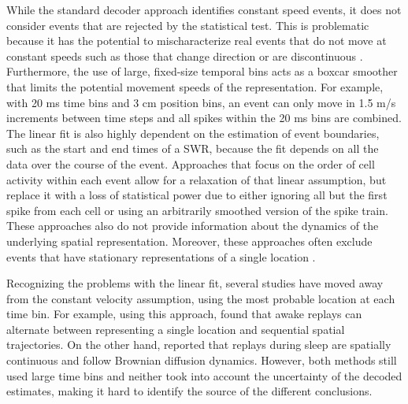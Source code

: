 \documentclass[9pt,lineno]{elife}
\begin{document}
While the standard decoder approach identifies constant speed events, it does not consider events that are rejected by the statistical test. This is problematic because it has the potential to mischaracterize real events that do not move at constant speeds such as those that change direction or are discontinuous \citep{LiuMethodsAssessmentMemory2018}. Furthermore, the use of large, fixed-size temporal bins acts as a boxcar smoother that limits the potential movement speeds of the representation. For example, with 20 ms time bins and 3 cm position bins, an event can only move in 1.5 m/s increments between time steps and all spikes within the 20 ms bins are combined. The linear fit is also highly dependent on the estimation of event boundaries, such as the start and end times of a SWR, because the fit depends on all the data over the course of the event. Approaches that focus on the order of cell activity within each event \citep{LeeMemorySequentialExperience2002, GuptaHippocampalReplayNot2010} allow for a relaxation of that linear assumption, but replace it with a loss of statistical power due to either ignoring all but the first spike from each cell or using an arbitrarily smoothed version of the spike train. These approaches also do not provide information about the dynamics of the underlying spatial representation. Moreover, these approaches often exclude events that have stationary representations of a single location \citep{YuDistincthippocampalcorticalmemory2017, FarooqEmergencepreconfiguredplastic2019}. 

Recognizing the problems with the linear fit, several studies have moved away from the constant velocity assumption, using the most probable location at each time bin. For example, using this approach, \cite{PfeifferAutoassociativedynamicsgeneration2015} found that awake replays can alternate between representing a single location and sequential spatial trajectories. On the other hand, \cite{StellaHippocampalReactivationRandom2019} reported that replays during sleep are spatially continuous and follow Brownian diffusion dynamics. However, both methods still used large time bins and neither took into account the uncertainty of the decoded estimates, making it hard to identify the source of the different conclusions.
\end{document}
